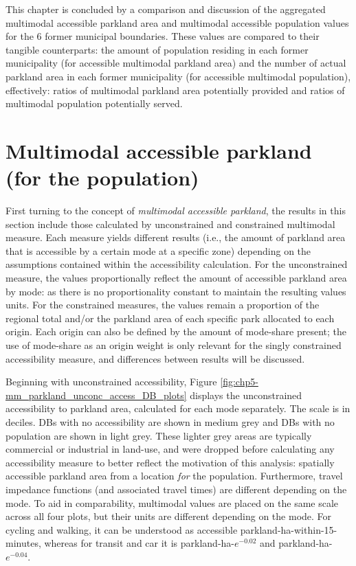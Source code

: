 \documentclass[
11pt, %
oneside, %
english, %
singlespacing, %
]{macthesis} %
\begin{document}
This chapter is concluded by a comparison and discussion of the aggregated multimodal accessible parkland area and multimodal accessible population values for the 6 former municipal boundaries. These values are compared to their tangible counterparts: the amount of population residing in each former municipality (for accessible multimodal parkland area) and the number of actual parkland area in each former municipality (for accessible multimodal population), effectively: ratios of multimodal parkland area potentially provided and ratios of multimodal population potentially served.

\section{Multimodal accessible parkland (for the population)}\label{multimodal-accessible-parkland-for-the-population}

First turning to the concept of \emph{multimodal accessible parkland}, the results in this section include those calculated by unconstrained and constrained multimodal measure. Each measure yields different results (i.e., the amount of parkland area that is accessible by a certain mode at a specific zone) depending on the assumptions contained within the accessibility calculation. For the unconstrained measure, the values proportionally reflect the amount of accessible parkland area by mode: as there is no proportionality constant to maintain the resulting values units. For the constrained measures, the values remain a proportion of the regional total and/or the parkland area of each specific park allocated to each origin. Each origin can also be defined by the amount of mode-share present; the use of mode-share as an origin weight is only relevant for the singly constrained accessibility measure, and differences between results will be discussed.

Beginning with unconstrained accessibility, Figure \ref{fig:chp5-mm_parkland_unconc_access_DB_plots} displays the unconstrained accessibility to parkland area, calculated for each mode separately. The scale is in deciles. DBs with no accessibility are shown in medium grey and DBs with no population are shown in light grey. These lighter grey areas are typically commercial or industrial in land-use, and were dropped before calculating any accessibility measure to better reflect the motivation of this analysis: spatially accessible parkland area from a location \emph{for} the population. Furthermore, travel impedance functions (and associated travel times) are different depending on the mode. To aid in comparability, multimodal values are placed on the same scale across all four plots, but their units are different depending on the mode. For cycling and walking, it can be understood as accessible parkland-ha-within-15-minutes, whereas for transit and car it is parkland-ha-\(e^{-0.02}\) and parkland-ha-\(e^{-0.04}\).
\end{document}
